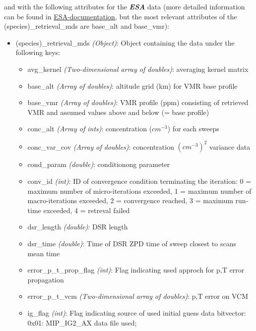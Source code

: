 \clearpage
\newpage
and with the following attributes for the \textbf{\emph{ESA}} data (more detailed information can be found in
\href{https://earth.esa.int/documents/700255/707722/Vol12_Mipas_5A.pdf/7596ef24-8dd3-4b7b-95c8-d72ddf6e046a}{ESA-documentation},
but the most relevant attributes of the (species)\_retrieval\_mds are base\_alt and base\_vmr):
\begin{itemize}
    \item (species)\_retrieval\_mds \emph{(Object)}: Object containing the data under the
        following keys:
        \begin{itemize}
            \item avg\_kernel \emph{(Two-dimensional array of doubles)}: averaging kernel matrix 
            \item base\_alt \emph{(Array of doubles)}: altitude grid (km) for VMR base profile
            \item base\_vmr \emph{(Array of doubles)}: VMR profile (ppm) consisting of retrieved VMR and
                assumed values above and below (= base profile) 
            \item conc\_alt \emph{(Array of ints)}: concentration (\(cm^{-3}\)) for each sweeps 
            \item conc\_var\_cov \emph{(Array of doubles)}: concentration \((cm^{-3})^{2}\) variance data
            \item cond\_param \emph{(double)}: conditionong parameter
            \item conv\_id \emph{(int)}: ID of convergence condition terminating the iteration:
                0 = maximum number of micro-iterations exceeded,
                1 = maximum number of macro-iterations exceeded,
                2 = convergence reached,
                3 = maximum run-time exceeded,
                4 = retreval failed  
            \item dsr\_length \emph{(double)}: DSR length 
            \item dsr\_time \emph{(double)}: Time of DSR ZPD time of sweep closest to scans mean time 
            \item error\_p\_t\_prop\_flag \emph{(int)}: Flag indicating used approch for p,T error propagation
            \item error\_p\_t\_vcm \emph{(Two-dimensional array of doubles)}: p,T error on VCM 
            \item ig\_flag \emph{(int)}: Flag indicating source of used initial guess data bitvector:
                0x01: MIP\_IG2\_AX data file used;

\end{itemize}
\end{itemize}

